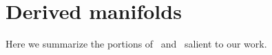  
\section{Derived manifolds}

Here we summarize the portions of~\cite{spivak} and~\cite{spivak-thesis} salient to our work.
